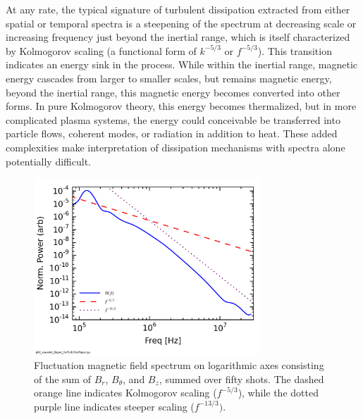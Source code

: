 \documentclass[aip,pop,amsmath,amssymb,preprint,superscriptaddress]{revtex4-1} %
\begin{document}
At any rate, the typical signature of turbulent dissipation extracted from either spatial or temporal spectra is a steepening of the spectrum at decreasing scale or increasing frequency just beyond the inertial range, which is itself characterized by Kolmogorov scaling (a functional form of $k^{-5/3}$ or $f^{-5/3}$). This transition indicates an energy sink in the process. While within the inertial range, magnetic energy cascades from larger to smaller scales, but remains magnetic energy, beyond the inertial range, this magnetic energy becomes converted into other forms. In pure Kolmogorov theory, this energy becomes thermalized, but in more complicated plasma systems, the energy could conceivable be transferred into particle flows, coherent modes, or radiation in addition to heat. These added complexities make interpretation of dissipation mechanisms with spectra alone potentially difficult. 

\begin{figure}
\centerline{
\includegraphics[width=8.5cm]{figure2.jpg}}
\caption{\label{fig:spectra} Fluctuation magnetic field spectrum on logarithmic axes consisting of the sum of $B_r$, $B_{\theta}$, and $B_z$, summed over fifty shots. The dashed orange line indicates Kolmogorov scaling ($f^{-5/3}$), while the dotted purple line indicates steeper scaling ($f^{-13/3})$.}
\end{figure}
\end{document}
